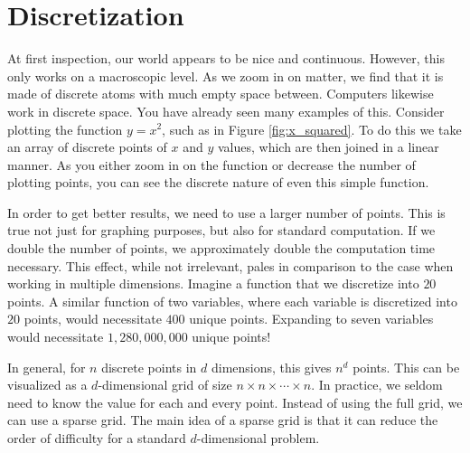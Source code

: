 \label{lab:spgrid}


\section*{Discretization}
At first inspection, our world appears to be nice and continuous.  However, this only works on a macroscopic level.  As we zoom in on matter, we find that it is made of discrete atoms with much empty space between.  Computers likewise work in discrete space.  You have already seen many examples of this.  Consider plotting the function $y=x^2$, such as in Figure \ref{fig:x_squared}.  To do this we take an array of discrete points of $x$ and $y$ values, which are then joined in a linear manner.  As you either zoom in on the function or decrease the number of plotting points, you can see the discrete nature of even this simple function.

In order to get better results, we need to use a larger number of points.  This is true not just for graphing purposes, but also for standard computation.  If we double the number of points, we approximately double the computation time necessary.  This effect, while not irrelevant, pales in comparison to the case when working in multiple dimensions.  Imagine a function that we discretize into $20$ points.  A similar function of two variables, where each variable is discretized into $20$ points, would necessitate $400$ unique points.  Expanding to seven variables would necessitate $1,280,000,000$ unique points!

In general, for $n$ discrete points in $d$ dimensions, this gives $n^d$ points.  This can be visualized as a $d$-dimensional grid of size $n \times n \times \cdots \times n$. In practice, we seldom need to know the value for each and every point.  Instead of using the full grid, we can use a sparse grid.  The main idea of a sparse grid is that it can reduce the order of difficulty for a standard $d$-dimensional problem.

